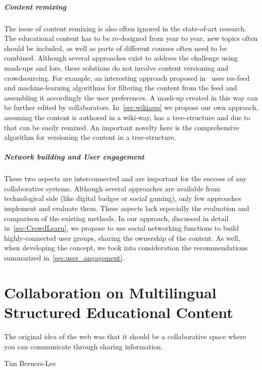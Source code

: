 \documentclass[PhD, Submit, ngerman,UKenglish,table]{scrbook}
\begin{document}
\paragraph{Content remixing}
The issue of content remixing is also often ignored in the state-of-art research.
The educational content has to be re-designed from year to year, new topics often should be included, as well as parts of different courses often need to be combined.
Although several approaches exist to address the challenge using mash-ups and \gls{lor}s, these solutions do not involve content versioning and crowdsourcing. 
For example, an interesting approach proposed in~\cite{Auinger2009} uses \gls{rss}-feed and machine-learning algorithms for filtering the content from the feed and assembling it accordingly the user preferences.
A mash-up created in this way can be further edited by collaborators.
In~\autoref{sec:wikiapp} we propose our own approach, assuming the content is authored in a wiki-way, has a tree-structure and due to that can be easily remixed.
An important novelty here is the comprehensive algorithm for versioning the content in a tree-structure.

\paragraph{Network building and User engagement}
These two aspects are interconnected and are important for the success of any collaborative systems.
Although several approaches are available from technological side (like digital badges or social gaming), only few approaches implement and evaluate them.
These aspects lack especially the evaluation and comparison of the existing methods. 
In our approach, discussed in detail in~\autoref{sec:CrowdLearn}, we propose to use social networking functions to build highly-connected user groups, sharing the ownership of the content.
As well, when developing the concept, we took into consideration the recommendations summarized in~\autoref{sec:user_angagement}.

\chapter{Collaboration on Multilingual Structured Educational Content}
\label{chapter:collaboration}

\epigraph{The original idea of the web was that it should be a collaborative space where you can communicate through sharing information.}{Tim Berners-Lee}
\end{document}
